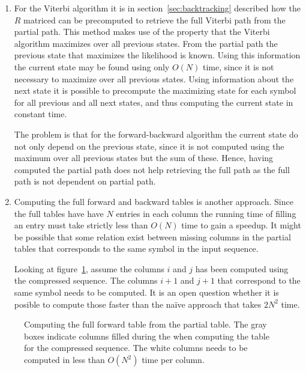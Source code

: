 \begin{enumerate}
\item For the Viterbi algorithm it is in section~\ref{sec:backtracking}
  described how the $R$ matriced can be precomputed to retrieve the full
  Viterbi path from the partial path. This method makes use of the property
  that the Viterbi algorithm maximizes over all previous states. From the
  partial path the previous state that maximizes the likelihood is known. Using
  this information the current state may be found using only $O(N)$ time, since
  it is not necessary to maximize over all previous states. Using information
  about the next state it is possible to precompute the maximizing state for
  each symbol for all previous and all next states, and thus computing the
  current state in constant time.

  The problem is that for the forward-backward algorithm the current state do
  not only depend on the previous state, since it is not computed using the
  maximum over all previous states but the sum of these. Hence, having computed
  the partial path does not help retrieving the full path as the full path is
  not dependent on partial path.
\item Computing the full forward and backward tables is another approach. Since
  the full tables have have $N$ entries in each column the running time of
  filling an entry must take strictly less than $O(N)$ time to gain a
  speedup. It might be possible that some relation exist between missing
  columns in the partial tables that corresponds to the same symbol in the
  input sequence.

  Looking at figure~\ref{fig:full-forward-table}, assume the columns $i$ and
  $j$ has been computed using the compressed sequence. The columns $i + 1$ and
  $j + 1$  that correspond to the same symbol needs to be computed. It is an
  open question whether it is posible to compute those faster than the naïve
  approach that takes $2N^2$ time.
\end{enumerate}

\begin{figure}
  \centering
  
  \caption{Computing the full forward table from the partial table. The gray
    boxes indicate columns filled during the when computing the table for the
    compressed sequence. The white columns needs to be computed in less than
    $O(N^2)$ time per column.}
  \label{fig:full-forward-table}
\end{figure}

